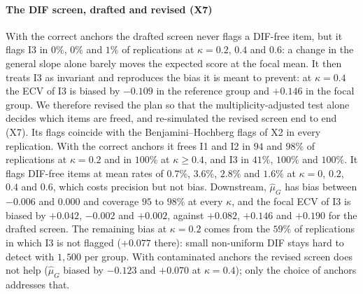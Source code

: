 \paragraph{The DIF screen, drafted and revised (X7)}
With the correct anchors the drafted screen never flags a DIF-free item, but it flags I3 in $0\%$, $0\%$ and $1\%$ of replications at $\kappa=0.2$, $0.4$ and $0.6$: a change in the general slope alone barely moves the expected score at the focal mean. It then treats I3 as invariant and reproduces the bias it is meant to prevent: at $\kappa=0.4$ the ECV of I3 is biased by $-0.109$ in the reference group and $+0.146$ in the focal group. We therefore revised the plan so that the multiplicity-adjusted test alone decides which items are freed, and re-simulated the revised screen end to end (X7). Its flags coincide with the Benjamini--Hochberg flags of X2 in every replication. With the correct anchors it frees I1 and I2 in $94$ and $98\%$ of replications at $\kappa=0.2$ and in $100\%$ at $\kappa\ge0.4$, and I3 in $41\%$, $100\%$ and $100\%$. It flags DIF-free items at mean rates of $0.7\%$, $3.6\%$, $2.8\%$ and $1.6\%$ at $\kappa=0$, $0.2$, $0.4$ and $0.6$, which costs precision but not bias. Downstream, $\hat\mu_G$ has bias between $-0.006$ and $0.000$ and coverage $95$ to $98\%$ at every $\kappa$, and the focal ECV of I3 is biased by $+0.042$, $-0.002$ and $+0.002$, against $+0.082$, $+0.146$ and $+0.190$ for the drafted screen. The remaining bias at $\kappa=0.2$ comes from the $59\%$ of replications in which I3 is not flagged ($+0.077$ there): small non-uniform DIF stays hard to detect with $1{,}500$ per group. With contaminated anchors the revised screen does not help ($\hat\mu_G$ biased by $-0.123$ and $+0.070$ at $\kappa=0.4$); only the choice of anchors addresses that.

